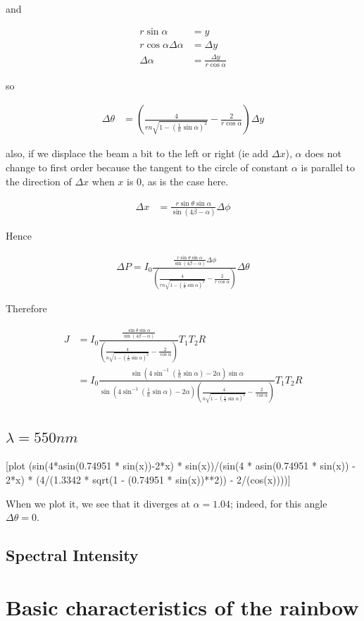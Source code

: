 \documentclass{article}
\newcommand{\D}{\Delta}
\begin{document}
and

\begin{align*}
r \sin\alpha &= y \\
r \cos\alpha \D\alpha &= \D y \\
\D\alpha &= \frac{\D y}{r \cos\alpha}
\end{align*}

so

\begin{align*}
\D\theta &= \left(\frac{4}{rn\sqrt{1 - (\frac{1}{n}\sin\alpha)^2}} - \frac{2}{r\cos\alpha}\right) \D y
\end{align*}

also, if we displace the beam a bit to the left or right (ie add $\D x$), $\alpha$ does not change to first order because the tangent to the circle of constant $\alpha$ is parallel to the direction of $\D x$ when $x$ is 0, as is the case here.

\begin{align*}
\D x &= \frac{r\sin\theta\sin\alpha}{\sin(4\beta - \alpha)} \D\phi
\end{align*}

Hence

\begin{align*}
\D P = I_0 \frac{\frac{r\sin\theta\sin\alpha}{\sin(4\beta - \alpha)} \D\phi}{\left(\frac{4}{rn\sqrt{1 - (\frac{1}{n}\sin\alpha)^2}} - \frac{2}{r\cos\alpha}\right)} \D\theta
\end{align*}

Therefore 

\begin{align*}
J &= I_0 \frac{\frac{\sin\theta\sin\alpha}{\sin(4\beta - \alpha)}}{\left(\frac{4}{n\sqrt{1 - (\frac{1}{n}\sin\alpha)^2}} - \frac{2}{\cos\alpha}\right)} T_1 T_2 R \\
&= I_0 \frac{\sin(4\sin^{-1}(\frac{1}{n} \sin\alpha)-2\alpha)\sin\alpha}{\sin(4\sin^{-1}(\frac{1}{n} \sin\alpha) - 2\alpha)\left(\frac{4}{n\sqrt{1 - (\frac{1}{n}\sin\alpha)^2}} - \frac{2}{\cos\alpha}\right)} T_1 T_2 R
\end{align*}

\subsection{$\lambda = 550 nm$}

[plot (sin(4*asin(0.74951 * sin(x))-2*x) * sin(x))/(sin(4 * asin(0.74951 * sin(x)) - 2*x) * (4/(1.3342 * sqrt(1 - (0.74951 * sin(x))**2)) - 2/(cos(x))))]

When we plot it, we see that it diverges at $\alpha = 1.04$; indeed, for this angle $\D \theta = 0$.

\subsection{Spectral Intensity}

\section{Basic characteristics of the rainbow}
\end{document}
